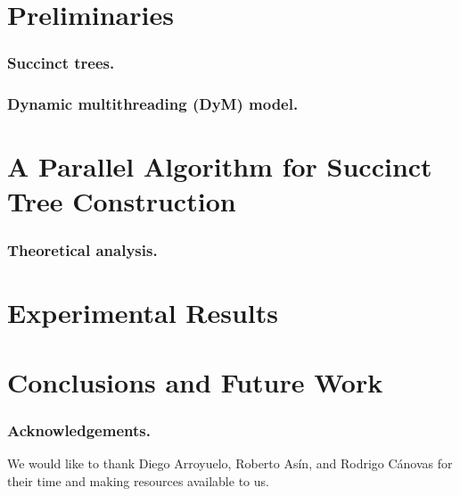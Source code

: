 \documentclass[runningheads]{llncs}
\begin{document}

\section{Preliminaries}
\label{sec:relwork}


\subsubsection{Succinct trees.}
\label{subsec:suctrees}


\subsubsection{Dynamic multithreading (DyM) model.}
\label{subsec:dym}


\section{A Parallel Algorithm for Succinct Tree Construction}
\label{sec:multicoreST}


\subsubsection{Theoretical analysis.}
\label{subsec:theoreticalAnalysis}


\section{Experimental Results}
\label{sec:exps}





\section{Conclusions and Future Work}
\label{sec:conclusion}


\subsubsection*{Acknowledgements.}
We would like to thank Diego Arroyuelo, Roberto As\'{i}n, and Rodrigo
C\'{a}novas for their time and making resources available to us.



\end{document}
